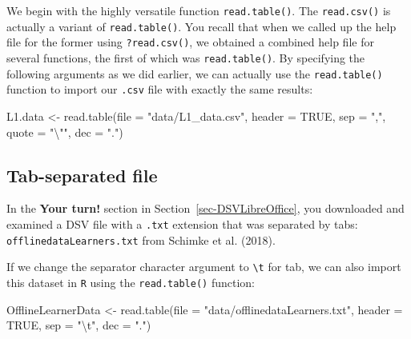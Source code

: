 \documentclass[
  letterpaper,
  DIV=11,
  numbers=noendperiod]{scrreprt}
\newenvironment{Shaded}{\begin{snugshade}}{\end{snugshade}}
\newcommand{\AttributeTok}[1]{\textcolor[rgb]{0.40,0.45,0.13}{#1}}
\newcommand{\ConstantTok}[1]{\textcolor[rgb]{0.56,0.35,0.01}{#1}}
\newcommand{\FunctionTok}[1]{\textcolor[rgb]{0.28,0.35,0.67}{#1}}
\newcommand{\NormalTok}[1]{\textcolor[rgb]{0.00,0.23,0.31}{#1}}
\newcommand{\OtherTok}[1]{\textcolor[rgb]{0.00,0.23,0.31}{#1}}
\newcommand{\SpecialCharTok}[1]{\textcolor[rgb]{0.37,0.37,0.37}{#1}}
\newcommand{\StringTok}[1]{\textcolor[rgb]{0.13,0.47,0.30}{#1}}
\begin{document}
We begin with the highly versatile function \texttt{read.table()}. The
\texttt{read.csv()} is actually a variant of \texttt{read.table()}. You
recall that when we called up the help file for the former using
\texttt{?read.csv()}, we obtained a combined help file for several
functions, the first of which was \texttt{read.table()}. By specifying
the following arguments as we did earlier, we can actually use the
\texttt{read.table()} function to import our \texttt{.csv} file with
exactly the same results:

\begin{Shaded}
\begin{Highlighting}[]
\NormalTok{L1.data }\OtherTok{\textless{}{-}} \FunctionTok{read.table}\NormalTok{(}\AttributeTok{file =} \StringTok{"data/L1\_data.csv"}\NormalTok{,}
                    \AttributeTok{header =} \ConstantTok{TRUE}\NormalTok{,}
                    \AttributeTok{sep =} \StringTok{","}\NormalTok{,}
                    \AttributeTok{quote =} \StringTok{"}\SpecialCharTok{\textbackslash{}"}\StringTok{"}\NormalTok{,}
                    \AttributeTok{dec =} \StringTok{"."}\NormalTok{)}
\end{Highlighting}
\end{Shaded}

\subsection{Tab-separated file}\label{tab-separated-file}

In the {\textbf{Your turn!}} section in
Section~\ref{sec-DSVLibreOffice}, you downloaded and examined a DSV file
with a \texttt{.txt} extension that was separated by tabs:
\texttt{offlinedataLearners.txt} from Schimke et al. (2018).

If we change the separator character argument to
\texttt{\textbackslash{}t} for tab, we can also import this dataset in
\texttt{R} using the \texttt{read.table()} function:

\begin{Shaded}
\begin{Highlighting}[]
\NormalTok{OfflineLearnerData }\OtherTok{\textless{}{-}} \FunctionTok{read.table}\NormalTok{(}\AttributeTok{file =} \StringTok{"data/offlinedataLearners.txt"}\NormalTok{,}
                                        \AttributeTok{header =} \ConstantTok{TRUE}\NormalTok{,}
                                        \AttributeTok{sep =} \StringTok{"}\SpecialCharTok{\textbackslash{}t}\StringTok{"}\NormalTok{,}
                                        \AttributeTok{dec =} \StringTok{"."}\NormalTok{)}
\end{Highlighting}
\end{Shaded}
\end{document}
